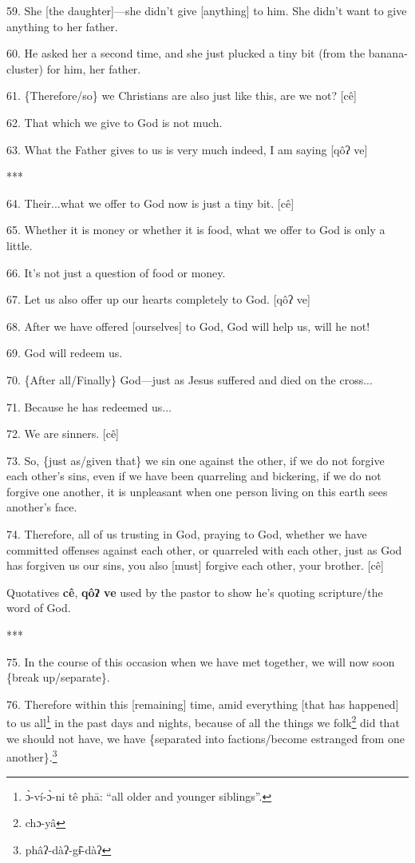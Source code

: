 59. She [the daughter]---she didn't give [anything] to him. She didn't want to
give anything to her father.

60. He asked her a second time, and she just plucked a tiny bit (from the banana-cluster)
for him, her father.

61. \{Therefore/so\} we Christians are also just like this, are we not? [cê]

62. That which we give to God is not much.

63. What the Father gives to us is very much indeed, I am saying [qôʔ ve]

***

64. Their...what we offer to God now is just a tiny bit. [cê]

65. Whether it is money or whether it is food, what we offer to God is only a little.

66. It's not just a question of food or money.

67. Let us also offer up our hearts completely to God. [qôʔ ve]

68. After we have offered [ourselves] to God, God will help us, will he not!

69. God will redeem us.

70. \{After all/Finally\} God---just as Jesus suffered and died on the cross...

71. Because he has redeemed us...

72. We are sinners. [cê]

73. So, \{just as/given that\} we sin one against the other, if we do not forgive
each other's sins, even if we have been quarreling and bickering, if we do not
forgive one another, it is unpleasant when one person living on this earth sees
another's face.

74. Therefore, all of us trusting in God, praying to God, whether we have committed
offenses against each other, or quarreled with each other, just as God has forgiven
us our sins, you also [must] forgive each other, your brother. [cê]

Quotatives \textbf{cê}, \textbf{qôʔ ve }used by the pastor to show he's quoting
scripture/the word of God.

***

75. In the course of this occasion when we have met together, we will now soon
\{break up/separate\}.

76. Therefore within this [remaining] time, amid everything [that has happened]
to us all\footnote{ɔ̀-ví-ɔ̀-ni tê phā: ``all older and younger siblings''.} in the past days and nights, because of all the things we folk\footnote{chɔ-yâ}
did that we should not have, we have \{separated into factions/become estranged
from one another\}.\footnote{phâʔ-dàʔ-gɨ̂-dàʔ}

